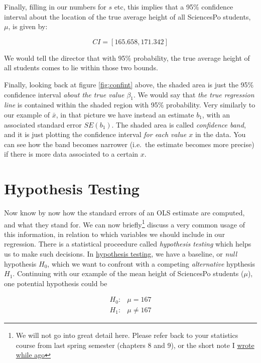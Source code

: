 \documentclass[]{book}
\let\rmarkdownfootnote\footnote%
\def\footnote{\protect\rmarkdownfootnote}
\begin{document}
Finally, filling in our numbers for \(s\) etc, this implies that a 95\%
confidence interval about the location of the true average height of all
SciencesPo students, \(\mu\), is given by:

\begin{equation}
CI = \left[165.658 , 171.342 \right]
\end{equation}

We would tell the director that with 95\% probability, the true average
height of all students comes to lie within those two bounds.

Finally, looking back at figure \ref{fig:confint} above, the shaded area
is just the 95\% confidence interval \emph{about the true value
\(\beta_1\)}. We would say that \emph{the true regression line} is
contained within the shaded region with 95\% probability. Very similarly
to our example of \(\bar{x}\), in that picture we have instead an
estimate \(b_1\), with an associated standard error \(SE(b_1)\). The
shaded area is called \emph{confidence band}, and it is just plotting
the confidence interval \emph{for each value \(x\)} in the data. You can
see how the band becomes narrower (i.e.~the estimate becomes more
precise) if there is more data associated to a certain \(x\).

\section{Hypothesis Testing}\label{hypothesis-testing}

Now know by now how the standard errors of an OLS estimate are computed,
and what they stand for. We can now briefly\footnote{We will not go into
  great detail here. Please refer back to your statistics course from
  last spring semester (chapters 8 and 9), or the short note I
  \href{images/hypothesis.pdf}{wrote while ago}} discuss a very common
usage of this information, in relation to which variables we should
include in our regression. There is a statistical proceedure called
\emph{hypothesis testing} which helps us to make such decisions. In
\href{https://en.wikipedia.org/wiki/Statistical_hypothesis_testing}{hypothesis
testing}, we have a baseline, or \emph{null} hypothesis \(H_0\), which
we want to confront with a competing \emph{alternative} hypthesis
\(H_1\). Continuing with our example of the mean height of SciencesPo
students (\(\mu\)), one potential hypothesis could be

\begin{align}
H_0:& \mu = 167\\
H_1:& \mu \neq 167
\end{align}
\end{document}
